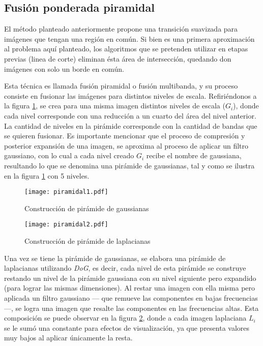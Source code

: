 \subsection{Fusión ponderada piramidal}

El método planteado anteriormente propone una transición suavizada para imágenes que tengan una región en común. Si bien es una primera aproximación al problema aquí planteado, los algoritmos que se pretenden utilizar en etapas previas (linea de corte) eliminan ésta área de intersección, quedando don imágenes con solo un borde en común. 

Esta técnica es llamada fusión piramidal o fusión multibanda, y su proceso consiste en fusionar las imágenes para distintos niveles de escala. Refiriéndonos a la figura \ref{imagen:piramidal1}, se crea para una misma imagen distintos niveles de escala ($G_i$), donde cada nivel corresponde con una reducción a un cuarto del área del nivel anterior. La cantidad de niveles en la pirámide corresponde con la cantidad de bandas que se quieren fusionar. Es importante mencionar que el proceso de compresión y posterior expansión de una imagen, se aproxima al proceso de aplicar un filtro gaussiano, con lo cual a cada nivel creado $G_i$ recibe el nombre de gaussiana, resultando lo que se denomina una pirámide de gaussianas, tal y como se ilustra en la figura \ref{imagen:piramidal1} con 5 niveles.

\begin{figure}[h]
	\centering
	\texttt{[image: piramidal1.pdf]}
	\caption[Construcción de pirámide de gaussianas]{Construcción de pirámide de gaussianas}
	\label{imagen:piramidal1}
\end{figure}

\begin{figure}[h]
	\centering
	\texttt{[image: piramidal2.pdf]}
	\caption[Construcción de pirámide de laplacianas]{Construcción de pirámide de laplacianas}
	\label{imagen:piramidal2}
\end{figure}

Una vez se tiene la pirámide de gaussianas, se elabora una pirámide de laplacianas utilizando \textit{DoG}, es decir, cada nivel de esta pirámide se construye restando un nivel de la pirámide gaussiana con su nivel siguiente pero expandido (para lograr las mismas dimensiones). Al restar una imagen con ella misma pero aplicada un filtro gaussiano --- que remueve las componentes en bajas frecuencias ---, se logra una imagen que resalte las componentes en las frecuencias altas. Esta composición se puede observar en la figura \ref{imagen:piramidal2}, donde a cada imagen laplaciana $L_i$ se le sumó una constante para efectos de visualización, ya que presenta valores muy bajos al aplicar únicamente la resta.

